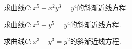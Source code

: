 \begin{example}
求曲线\(C: x^5+x^2y^3=y^4\)的斜渐近线方程.
\end{example}
\begin{example}
求曲线\(C: x^5+y^5=y^4\)的斜渐近线方程.
\end{example}

\begin{example}
求曲线\(C: x^3+y^3=y^2\)的斜渐近线方程.
\end{example}
